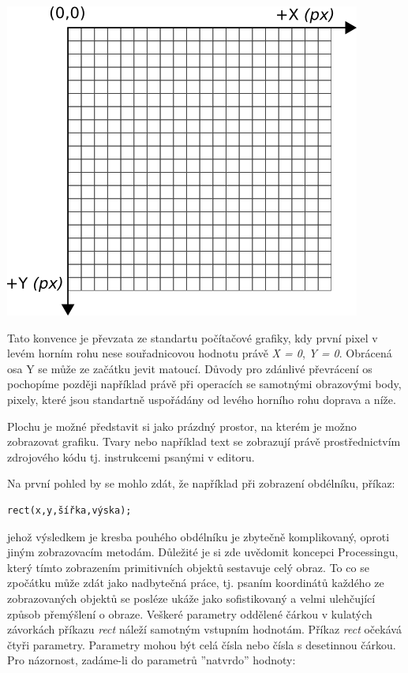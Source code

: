 \documentclass[12pt,twopage]{book}
\begin{document}
\begin{center}
\includegraphics[scale = 1]{imgs/grid2d.png}
\end{center}

Tato konvence je převzata ze standartu počítačové grafiky, kdy první pixel v levém horním rohu nese souřadnicovou hodnotu právě {\em X = 0}, {\em Y = 0}. Obrácená osa Y se může ze začátku jevit matoucí. Důvody pro zdánlivé převrácení os pochopíme později například právě při operacích se samotnými obrazovými body, pixely, které jsou standartně uspořádány od levého horního rohu doprava a níže.

Plochu je možné představit si jako prázdný prostor, na kterém je možno zobrazovat grafiku. Tvary nebo například text se zobrazují právě prostřednictvím zdrojového kódu tj. instrukcemi psanými v editoru.

Na první pohled by se mohlo zdát, že například při zobrazení obdélníku, příkaz:

\begin{lstlisting}
rect(x,y,šířka,výska);
\end{lstlisting}

jehož výsledkem je kresba pouhého obdélníku je zbytečně komplikovaný, oproti jiným zobrazovacím metodám. Důležité je si zde uvědomit koncepci Processingu, který tímto zobrazením primitivních objektů sestavuje celý obraz. To co se zpočátku může zdát jako nadbytečná práce, tj. psaním koordinátů každého ze zobrazovaných objektů se posléze ukáže jako sofistikovaný a velmi ulehčující způsob přemýšlení o obraze. Veškeré parametry oddělené čárkou v kulatých závorkách příkazu {\em rect} náleží samotným vstupním hodnotám. Příkaz {\em rect} očekává čtyři parametry. Parametry mohou být celá čísla nebo čísla s desetinnou čárkou. Pro názornost, zadáme-li do parametrů ''natvrdo'' hodnoty:
\end{document}
